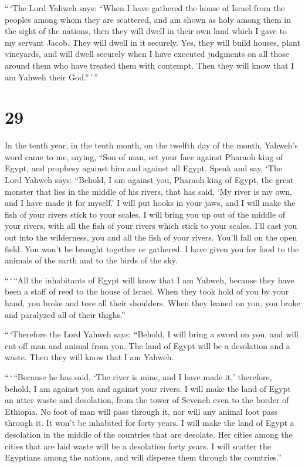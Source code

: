  ``\,`The Lord Yahweh says: ``When I have gathered the
house of Israel from the peoples among whom they are scattered, and am
shown as holy among them in the sight of the nations, then they will
dwell in their own land which I gave to my servant Jacob.
 They will dwell in it securely. Yes, they will build
houses, plant vineyards, and will dwell securely when I have executed
judgments on all those around them who have treated them with contempt.
Then they will know that I am Yahweh their God.''\,'\,''

\hypertarget{section-28}{%
\section{29}\label{section-28}}

 In the tenth year, in the tenth month, on the twelfth day
of the month, Yahweh's word came to me, saying,  ``Son of
man, set your face against Pharaoh king of Egypt, and prophesy against
him and against all Egypt.  Speak and say, `The Lord
Yahweh says: ``Behold, I am against you, Pharaoh king of Egypt, the
great monster that lies in the middle of his rivers, that has said, `My
river is my own, and I have made it for myself.'  I will
put hooks in your jaws, and I will make the fish of your rivers stick to
your scales. I will bring you up out of the middle of your rivers, with
all the fish of your rivers which stick to your scales. 
I'll cast you out into the wilderness, you and all the fish of your
rivers. You'll fall on the open field. You won't be brought together or
gathered. I have given you for food to the animals of the earth and to
the birds of the sky.

 ``\,`\,``All the inhabitants of Egypt will know that I am
Yahweh, because they have been a staff of reed to the house of Israel.
 When they took hold of you by your hand, you broke and
tore all their shoulders. When they leaned on you, you broke and
paralyzed all of their thighs.''

 ``\,`Therefore the Lord Yahweh says: ``Behold, I will
bring a sword on you, and will cut off man and animal from you.
 The land of Egypt will be a desolation and a waste. Then
they will know that I am Yahweh.

``\,`\,``Because he has said, `The river is mine, and I have made it,'
 therefore, behold, I am against you and against your
rivers. I will make the land of Egypt an utter waste and desolation,
from the tower of Seveneh even to the border of Ethiopia.
 No foot of man will pass through it, nor will any animal
foot pass through it. It won't be inhabited for forty years.
 I will make the land of Egypt a desolation in the middle
of the countries that are desolate. Her cities among the cities that are
laid waste will be a desolation forty years. I will scatter the
Egyptians among the nations, and will disperse them through the
countries.''

